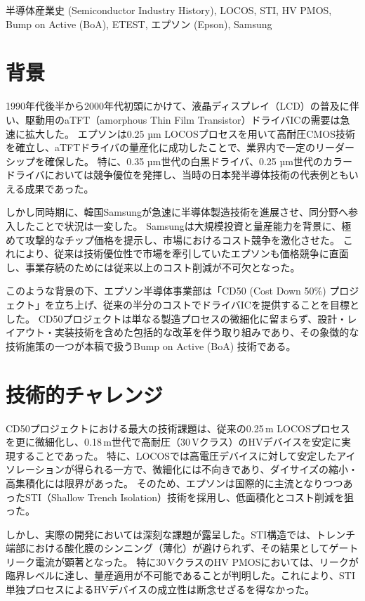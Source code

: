 \documentclass[conference]{IEEEtran}
\begin{document}
\begin{IEEEkeywords}
半導体産業史 (Semiconductor Industry History), LOCOS, STI, HV PMOS, 
Bump on Active (BoA), ETEST, エプソン (Epson), Samsung
\end{IEEEkeywords}

\section{背景}
1990年代後半から2000年代初頭にかけて、液晶ディスプレイ（LCD）の普及に伴い、駆動用のaTFT（amorphous Thin Film Transistor）ドライバICの需要は急速に拡大した。
エプソンは0.25 µm LOCOSプロセスを用いて高耐圧CMOS技術を確立し、aTFTドライバの量産化に成功したことで、業界内で一定のリーダーシップを確保した。
特に、0.35 µm世代の白黒ドライバ、0.25 µm世代のカラードライバにおいては競争優位を発揮し、当時の日本発半導体技術の代表例ともいえる成果であった。

しかし同時期に、韓国Samsungが急速に半導体製造技術を進展させ、同分野へ参入したことで状況は一変した。
Samsungは大規模投資と量産能力を背景に、極めて攻撃的なチップ価格を提示し、市場におけるコスト競争を激化させた。
これにより、従来は技術優位性で市場を牽引していたエプソンも価格競争に直面し、事業存続のためには従来以上のコスト削減が不可欠となった。

このような背景の下、エプソン半導体事業部は「CD50 (Cost Down 50\%) プロジェクト」を立ち上げ、従来の半分のコストでドライバICを提供することを目標とした。
CD50プロジェクトは単なる製造プロセスの微細化に留まらず、設計・レイアウト・実装技術を含めた包括的な改革を伴う取り組みであり、その象徴的な技術施策の一つが本稿で扱うBump on Active (BoA) 技術である。

\section{技術的チャレンジ}
CD50プロジェクトにおける最大の技術課題は、従来の0.25\,\mu m LOCOSプロセスを更に微細化し、0.18\,\mu m世代で高耐圧（30\,Vクラス）のHVデバイスを安定に実現することであった。  
特に、LOCOSでは高電圧デバイスに対して安定したアイソレーションが得られる一方で、微細化には不向きであり、ダイサイズの縮小・高集積化には限界があった。  
そのため、エプソンは国際的に主流となりつつあったSTI（Shallow Trench Isolation）技術を採用し、低面積化とコスト削減を狙った。

しかし、実際の開発においては深刻な課題が露呈した。STI構造では、トレンチ端部における酸化膜のシンニング（薄化）が避けられず、その結果としてゲートリーク電流が顕著となった。  
特に30\,VクラスのHV PMOSにおいては、リークが臨界レベルに達し、量産適用が不可能であることが判明した。これにより、STI単独プロセスによるHVデバイスの成立性は断念せざるを得なかった。
\end{document}
